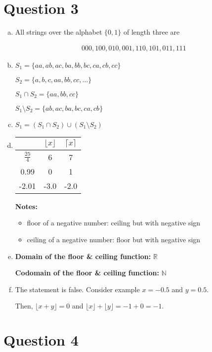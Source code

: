 \documentclass[12pt]{article}
\begin{document}
\section*{Question 3}
\begin{enumerate}[a.]
    \item

    All strings over the alphabet $\{0,1\}$ of length three are

    \begin{align*}
        000,100,010,001,110,101,011,111
    \end{align*}

    \item

    $S_1 = \{aa,ab,ac,ba,bb,bc,ca,cb,cc\}$

    $S_2 = \{a,b,c,aa,bb,cc,\dots\}$

    $S_1 \cap S_2 = \{aa,bb,cc\}$

    $S_1 \setminus S_2 = \{ab,ac,ba,bc,ca,cb\}$

    \item

    $S_1 = (S_1 \cap S_2) \cup (S_1 \setminus S_2)$

    \item

    \begin{tabular}{|c|c|c|}
        \hline
         & $\lfloor x \rfloor$ & $\lceil x \rceil$\\
        \hline
        $\frac{25}{4}$ & 6 & 7\\
        \hline
        0.99 & 0 & 1\\
        \hline
        -2.01 & -3.0 & -2.0\\
        \hline
    \end{tabular}

    \bigskip

    \textbf{Notes:}

    \begin{itemize}
        \item floor of a negative number: ceiling but with negative sign
        \item ceiling of a negative number: floor but with negative sign
    \end{itemize}

    \item

    \textbf{Domain of the floor \& ceiling function:} $\mathbb{R}$

    \textbf{Codomain of the floor \& ceiling function:} $\mathbb{N}$

    \item

    The statement is false. Consider example $x = -0.5$ and $y = 0.5$.

    \bigskip

    Then, $\lfloor x + y \rfloor = 0$ and $\lfloor x \rfloor + \lfloor y \rfloor = -1 + 0 = -1$.

\end{enumerate}

\section*{Question 4}
\end{document}

